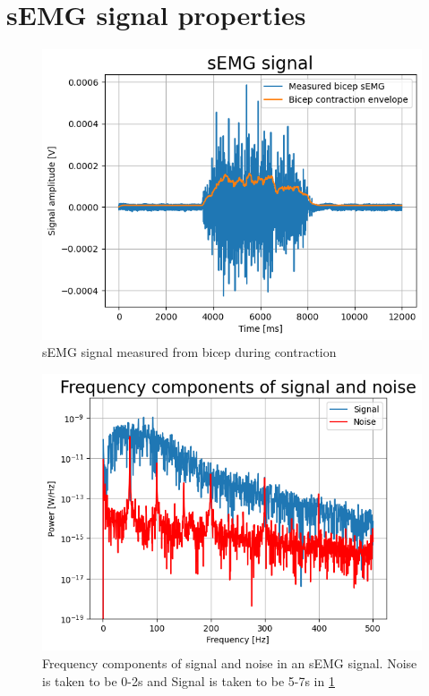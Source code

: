 \section{sEMG signal properties}

\begin{figure}[h!t]
	\begin{center}
		\includegraphics[width=0.7\columnwidth]{images/sEMG_signal_example.png}
	\end{center}
	\caption{sEMG signal measured from bicep during contraction}
	\label{fig:sEMG_signal_example}
\end{figure}

\begin{figure}[h!t]
	\begin{center}
		\includegraphics[width=0.7\columnwidth]{images/sEMG_fft_signalnoise_example.png}
	\end{center}
	\caption{Frequency components of signal and noise in an sEMG signal. 
    Noise is taken to be 0-2s and Signal is taken to be 5-7s in \ref{fig:sEMG_signal_example}}
	\label{fig:sEMG_fft_signalnoise_example}
\end{figure}

